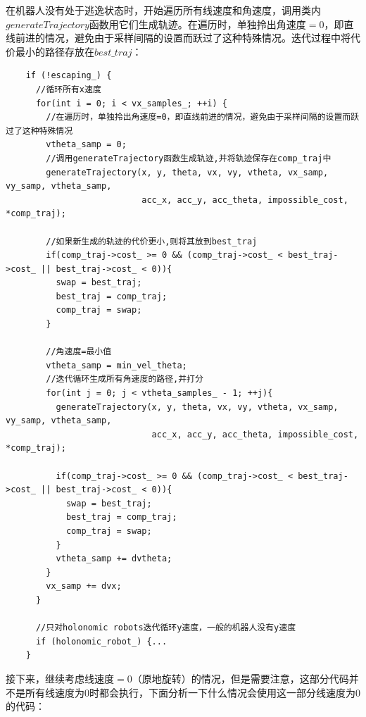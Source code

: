 \documentclass[9pt, oneside]{book}
\begin{document}
在机器人没有处于逃逸状态时，开始遍历所有线速度和角速度，调用类内$generateTrajectory$函数用它们生成轨迹。在遍历时，单独拎出角速度$=0$，即直线前进的情况，避免由于采样间隔的设置而跃过了这种特殊情况。迭代过程中将代价最小的路径存放在$best\_traj$：

\footnotesize
\begin{verbatim}
    if (!escaping_) {
      //循环所有x速度
      for(int i = 0; i < vx_samples_; ++i) {
        //在遍历时，单独拎出角速度=0，即直线前进的情况，避免由于采样间隔的设置而跃过了这种特殊情况
        vtheta_samp = 0;
        //调用generateTrajectory函数生成轨迹,并将轨迹保存在comp_traj中
        generateTrajectory(x, y, theta, vx, vy, vtheta, vx_samp, vy_samp, vtheta_samp,
                           acc_x, acc_y, acc_theta, impossible_cost, *comp_traj);

        //如果新生成的轨迹的代价更小,则将其放到best_traj
        if(comp_traj->cost_ >= 0 && (comp_traj->cost_ < best_traj->cost_ || best_traj->cost_ < 0)){
          swap = best_traj;
          best_traj = comp_traj;
          comp_traj = swap;
        }

        //角速度=最小值
        vtheta_samp = min_vel_theta;
        //迭代循环生成所有角速度的路径,并打分
        for(int j = 0; j < vtheta_samples_ - 1; ++j){
          generateTrajectory(x, y, theta, vx, vy, vtheta, vx_samp, vy_samp, vtheta_samp,
                             acc_x, acc_y, acc_theta, impossible_cost, *comp_traj);

          if(comp_traj->cost_ >= 0 && (comp_traj->cost_ < best_traj->cost_ || best_traj->cost_ < 0)){
            swap = best_traj;
            best_traj = comp_traj;
            comp_traj = swap;
          }
          vtheta_samp += dvtheta;
        }
        vx_samp += dvx;
      }

      //只对holonomic robots迭代循环y速度，一般的机器人没有y速度      
      if (holonomic_robot_) {...
    }
\end{verbatim}
\normalsize

接下来，继续考虑线速度$=0$（原地旋转）的情况，但是需要注意，这部分代码并不是所有线速度为0时都会执行，下面分析一下什么情况会使用这一部分线速度为0的代码：
\end{document}
